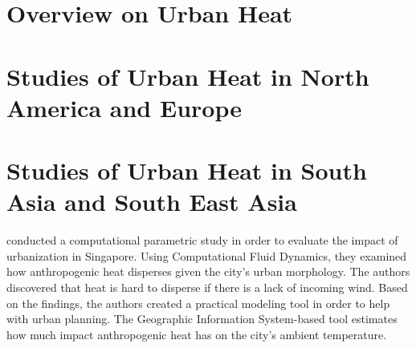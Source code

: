 \section{Overview on Urban Heat}
	\blindtext
	
\section{Studies of Urban Heat in North America and Europe}
	\blindtext
	
\section{Studies of Urban Heat in South Asia and South East Asia}
	\textcite{Yuan2020} conducted a computational parametric study in order to evaluate the impact of urbanization in Singapore.
	Using Computational Fluid Dynamics, they examined how anthropogenic heat disperses given the city's urban morphology.
	The authors discovered that heat is hard to disperse if there is a lack of incoming wind.
	Based on the findings, the authors created a practical modeling tool in order to help with urban planning. 
	The Geographic Information System-based tool estimates how much impact anthropogenic heat has on the city's ambient temperature.